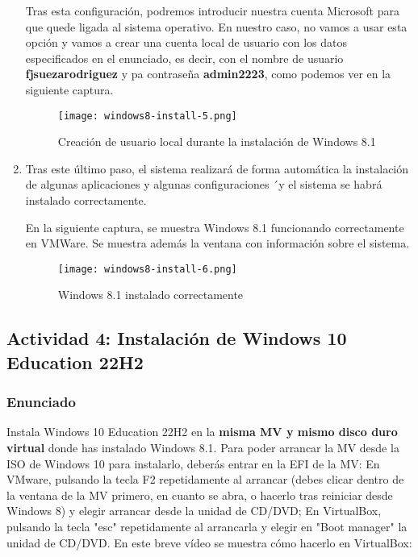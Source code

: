 \begin{enumerate}
    Tras esta configuración, podremos introducir nuestra cuenta Microsoft para que quede ligada al sistema operativo. En nuestro caso, no vamos a usar esta opción y vamos a crear una cuenta local de usuario con los datos especificados en el enunciado, es decir, con el nombre de usuario \textbf{fjsuezarodriguez} y pa contraseña \textbf{admin2223}, como podemos ver en la siguiente captura.

    \begin{figure}[H]
        \centering
        \texttt{[image: windows8-install-5.png]}
        \caption{Creación de usuario local durante la instalación de Windows 8.1}
    \end{figure}

    \item Tras este último paso, el sistema realizará de forma automática la instalación de algunas aplicaciones y algunas configuraciones ´y el sistema se habrá instalado correctamente.

    En la siguiente captura, se muestra Windows 8.1 funcionando correctamente en VMWare. Se muestra además la ventana con información sobre el sistema.

    \begin{figure}[H]
        \centering
        \texttt{[image: windows8-install-6.png]}
        \caption{Windows 8.1 instalado correctamente}
    \end{figure}
\end{enumerate}

\subsection{Actividad 4: Instalación de Windows 10 Education 22H2}

\subsubsection{Enunciado}

Instala Windows 10 Education 22H2 en la \textbf{misma MV y mismo disco duro virtual} donde has instalado Windows 8.1. Para poder arrancar la MV desde la ISO de Windows 10 para instalarlo, deberás entrar en la EFI de la MV: En VMware, pulsando la tecla F2 repetidamente al arrancar (debes clicar dentro de la ventana de la MV primero, en cuanto se abra, o hacerlo tras reiniciar desde Windows 8) y elegir arrancar desde la unidad de CD/DVD; En VirtualBox, pulsando la tecla "esc" repetidamente al arrancarla y elegir en "Boot manager" la unidad de CD/DVD. En este breve vídeo se muestra cómo hacerlo en VirtualBox:

